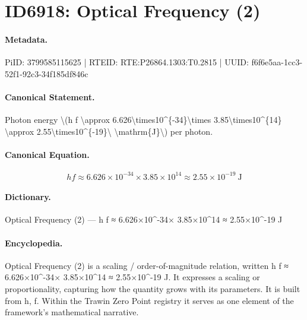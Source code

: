 \section*{ID6918: Optical Frequency (2)}
\paragraph{Metadata.}
PiID: 3799585115625 | RTEID: RTE:P26864.1303:T0.2815 | UUID: f6f6e5aa-1cc3-52f1-92c3-34f185df846c

\paragraph{Canonical Statement.}
Photon energy \textbackslash{}(h f \textbackslash{}approx 6.626\textbackslash{}times10\textasciicircum{}\{-34\}\textbackslash{}times 3.85\textbackslash{}times10\textasciicircum{}\{14\} \textbackslash{}approx 2.55\textbackslash{}times10\textasciicircum{}\{-19\}\textbackslash{} \textbackslash{}mathrm\{J\}\textbackslash{}) per photon.

\paragraph{Canonical Equation.}
\[
h f \approx 6.626\times10^{-34}\times 3.85\times10^{14} \approx 2.55\times10^{-19}\ \mathrm{J}
\]

\paragraph{Dictionary.}
Optical Frequency (2) — h f ≈ 6.626×10\textasciicircum{}-34× 3.85×10\textasciicircum{}14 ≈ 2.55×10\textasciicircum{}-19 J

\paragraph{Encyclopedia.}
Optical Frequency (2) is a scaling / order-of-magnitude relation, written h f ≈ 6.626×10\textasciicircum{}-34× 3.85×10\textasciicircum{}14 ≈ 2.55×10\textasciicircum{}-19 J. It expresses a scaling or proportionality, capturing how the quantity grows with its parameters. It is built from h, f. Within the Trawin Zero Point registry it serves as one element of the framework's mathematical narrative.
